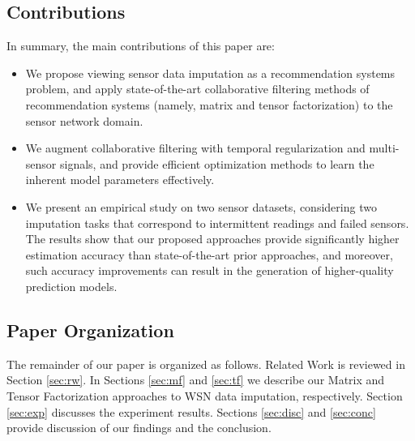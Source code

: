 
\subsection{Contributions}

In summary, the main contributions of this paper are:
\begin{itemize}
\item We propose viewing sensor data imputation as a recommendation systems problem, and apply state-of-the-art collaborative filtering methods of recommendation systems (namely, matrix and tensor factorization) to the sensor network domain.
\item We augment collaborative filtering with temporal regularization and multi-sensor signals, and provide efficient optimization methods to learn the inherent model parameters effectively.
\item We present an empirical study on two sensor datasets, considering two
imputation tasks that correspond to intermittent readings and failed
sensors. The results show that our proposed approaches provide
significantly higher estimation accuracy than state-of-the-art prior
approaches, and moreover, such accuracy improvements can result in the
generation of higher-quality prediction models.
\end{itemize}


\subsection{Paper Organization}

The remainder of our paper is organized as follows.  Related Work is
reviewed in Section \ref{sec:rw}.  In Sections \ref{sec:mf} and
\ref{sec:tf} we describe our Matrix and Tensor Factorization
approaches to WSN data imputation, respectively. Section \ref{sec:exp} discusses the experiment results. Sections \ref{sec:disc} and \ref{sec:conc} provide discussion of our findings
and the conclusion.
